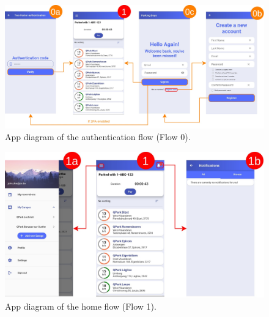 \clearpage
\begin{figure}[hpt]
    \centering
    \includegraphics[width=16cm]{images/app/app_diagrams/app_diagram-auth-flow.jpg}
    \caption{App diagram of the authentication flow (Flow 0).}
    \label{fig:auth-flow}
\end{figure}
\begin{figure}[hpt]
    \centering
    \includegraphics[width=16cm]{images/app/app_diagrams/app_diagram-home-flow.jpg}
    \caption{App diagram of the home flow (Flow 1).}
    \label{fig:home-flow}
\end{figure}

\clearpage

